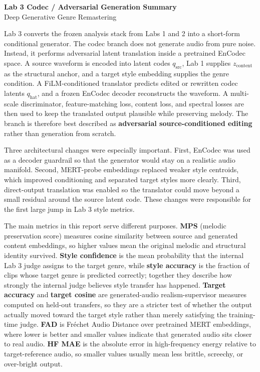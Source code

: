 \documentclass[10pt]{article}
\begin{document}
\begin{center}
{\Large \textbf{Lab 3 Codec / Adversarial Generation Summary}}\\
Deep Generative Genre Remastering
\end{center}

Lab 3 converts the frozen analysis stack from Labs 1 and 2 into a short-form conditional generator. The codec branch does not generate audio from pure noise. Instead, it performs adversarial latent translation inside a pretrained EnCodec space. A source waveform is encoded into latent codes $q_{\text{src}}$, Lab 1 supplies $z_{\text{content}}$ as the structural anchor, and a target style embedding supplies the genre condition. A FiLM-conditioned translator predicts edited or rewritten codec latents $q_{\text{hat}}$, and a frozen EnCodec decoder reconstructs the waveform. A multi-scale discriminator, feature-matching loss, content loss, and spectral losses are then used to keep the translated output plausible while preserving melody. The branch is therefore best described as \textbf{adversarial source-conditioned editing} rather than generation from scratch.

Three architectural changes were especially important. First, EnCodec was used as a decoder guardrail so that the generator would stay on a realistic audio manifold. Second, MERT-probe embeddings replaced weaker style centroids, which improved conditioning and separated target styles more clearly. Third, direct-output translation was enabled so the translator could move beyond a small residual around the source latent code. These changes were responsible for the first large jump in Lab 3 style metrics.

The main metrics in this report serve different purposes. \textbf{MPS} (melodic preservation score) measures cosine similarity between source and generated content embeddings, so higher values mean the original melodic and structural identity survived. \textbf{Style confidence} is the mean probability that the internal Lab 3 judge assigns to the target genre, while \textbf{style accuracy} is the fraction of clips whose target genre is predicted correctly; together they describe how strongly the internal judge believes style transfer has happened. \textbf{Target accuracy} and \textbf{target cosine} are generated-audio realism-supervisor measures computed on held-out transfers, so they are a stricter test of whether the output actually moved toward the target style rather than merely satisfying the training-time judge. \textbf{FAD} is Fr\'echet Audio Distance over pretrained MERT embeddings, where lower is better and smaller values indicate that generated audio sits closer to real audio. \textbf{HF MAE} is the absolute error in high-frequency energy relative to target-reference audio, so smaller values usually mean less brittle, screechy, or over-bright output.
\end{document}
